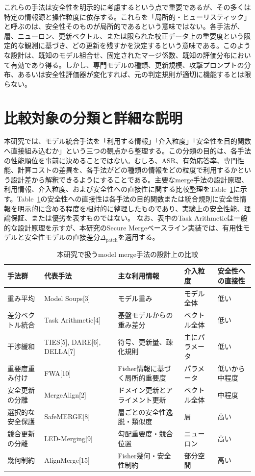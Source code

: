 \documentclass{article}
\begin{document}
これらの手法は安全性を明示的に考慮するという点で重要であるが、その多くは特定の情報源と操作粒度に依存する。これらを「局所的・ヒューリスティック」と呼ぶのは、安全性そのものが局所的であるという意味ではない。各手法が、層、ニューロン、更新ベクトル、または限られた校正データ上の重要度という限定的な観測に基づき、どの更新を残すかを決定するという意味である。このような設計は、既知のモデル組合せ、固定されたマージ係数、既知の評価分布において有効であり得る。しかし、専門モデルの種類、更新規模、攻撃プロンプトの分布、あるいは安全性評価器が変化すれば、元の判定規則が適切に機能するとは限らない。


\section{比較対象の分類と詳細な説明}
\label{app:method-taxonomy-and-details}

本研究では、モデル統合手法を「利用する情報」「介入粒度」「安全性を目的関数へ直接組み込むか」という三つの観点から整理する。この分類の目的は、各手法の性能順位を事前に決めることではない。むしろ、ASR、有効応答率、専門性能、計算コストの差異を、各手法がどの種類の情報をどの粒度で利用するかという設計差から解釈できるようにすることである。主要なmerge手法の設計原理、利用情報、介入粒度、および安全性への直接性に関する比較整理をTable~\ref{tab:method-comparison-revised}に示す。Table~\ref{tab:method-comparison-revised}の安全性への直接性は各手法の目的関数または統合規則に安全性情報を明示的に含める程度を相対的に整理したものであり、実験上の安全性能、理論保証、または優劣を表すものではない。
なお、表中のTask Arithmeticは一般的な設計原理を示すが、本研究のSecure Mergeベースライン実装では、有用性モデルと安全性モデルの直接差分\(\Delta_{\mathrm{patch}}\)を適用する。

\begin{table}[t]
\centering
\caption{本研究で扱うmodel merge手法の設計上の比較}
\label{tab:method-comparison-revised}
\small
\begin{tabular}{p{2.3cm}p{2.7cm}p{3.0cm}p{2.0cm}p{2.6cm}}
\toprule
手法群 & 代表手法 & 主な利用情報 & 介入粒度 & 安全性への直接性 \\
\midrule
重み平均 &
Model Soups[3] &
モデル重み &
モデル全体 &
低い \\
差分ベクトル統合 &
Task Arithmetic[4] &
基盤モデルからの重み差分 &
ベクトル全体 &
低い \\
干渉緩和 &
TIES[5], DARE[6], DELLA[7] &
符号、更新量、疎化規則 &
主にパラメータ &
低い \\
重要度重み付け &
FWA[10] &
Fisher情報に基づく局所的重要度 &
パラメータ &
低いから中程度 \\
安全更新の分離 &
MergeAlign[2] &
ドメイン更新とアライメント更新 &
ベクトル全体 &
中程度 \\
選択的な安全保護 &
SafeMERGE[8] &
層ごとの安全性逸脱・類似度 &
層 &
高い \\
競合更新の分離 &
LED-Merging[9] &
勾配重要度・競合位置 &
ニューロン &
高い \\
幾何制約 &
AlignMerge[15] &
Fisher幾何・安全性制約 &
部分空間 &
高い \\
\bottomrule
\end{tabular}
\end{table}
\end{document}
